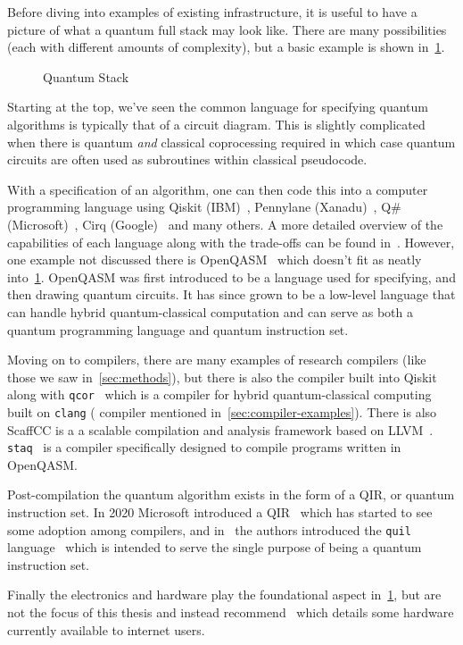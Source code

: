 Before diving into examples of existing infrastructure, it is useful to have a picture of what a quantum full stack may look like.
There are many possibilities (each with different amounts of complexity), but a basic example is shown in~\cref{fig:quantumstack}.

\begin{figure}[h]
    \centering
    
    \caption{Quantum Stack}\label{fig:quantumstack}
\end{figure}

Starting at the top, we've seen the common language for specifying quantum algorithms is typically that of a circuit diagram.
This is slightly complicated when there is quantum \emph{and} classical coprocessing required in which case quantum circuits are often used as subroutines within classical pseudocode.

With a specification of an algorithm, one can then code this into a computer programming language using Qiskit (IBM)~\cite{qiskit}, Pennylane (Xanadu)~\cite{pennylane}, Q\# (Microsoft)~\cite{qsharp}, Cirq (Google)~\cite{cirq} and many others.
A more detailed overview of the capabilities of each language along with the trade-offs can be found in~\cite{qlangcomparision}.
However, one example not discussed there is OpenQASM~\cite{openqasm2,openqasm3} which doesn't fit as neatly into~\cref{fig:quantumstack}.
OpenQASM was first introduced to be a language used for specifying, and then drawing quantum circuits.
It has since grown to be a low-level language that can handle hybrid quantum-classical computation and can serve as both a quantum programming language and quantum instruction set.

Moving on to compilers, there are many examples of research compilers (like those we saw in~\cref{sec:methods}), but there is also the compiler built into Qiskit along with \texttt{qcor}~\cite{qcor} which is a \CPP{} compiler for hybrid quantum-classical computing built on \texttt{clang} (\CPP{} compiler mentioned in~\cref{sec:compiler-examples}).
There is also ScaffCC is a a scalable compilation and analysis framework based on LLVM~\cite{scaffcc,scaffcc2}.
\texttt{staq}~\cite{staq} is a compiler specifically designed to compile programs written in OpenQASM.\@

Post-compilation the quantum algorithm exists in the form of a \ac{QIR}, or quantum instruction set.
In 2020 Microsoft introduced a \ac{QIR}~\cite{qir} which has started to see some adoption among compilers, and in~\cite{qisa} the authors introduced the \texttt{quil} language~\cite{quil} which is intended to serve the single purpose of being a quantum instruction set.

Finally the electronics and hardware play the foundational aspect in~\cref{fig:quantumstack}, but are not the focus of this thesis and instead recommend~\cite{qlangcomparision} which details some hardware currently available to internet users.
